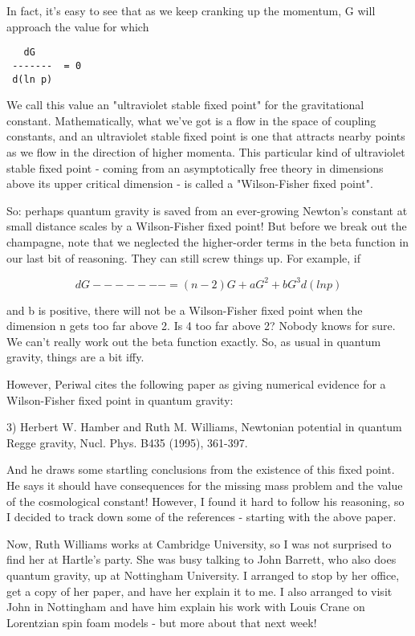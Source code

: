 In fact, it's easy to see that as we keep cranking up the momentum,
G will approach the value for which 

\begin{verbatim}
   dG 
 -------  = 0
 d(ln p)
\end{verbatim}
    
We call this value an "ultraviolet stable 
fixed point" for the gravitational
constant.  Mathematically, what we've got is a flow in the space 
of coupling constants, and an ultraviolet stable fixed point is one
that attracts nearby points as we flow in the direction of higher 
momenta.  This particular kind of ultraviolet stable fixed point - coming 
from an asymptotically free theory in dimensions above its upper 
critical dimension - is called a "Wilson-Fisher fixed point".  

So: perhaps quantum gravity is saved from an ever-growing Newton's
constant at small distance scales by a Wilson-Fisher fixed point!
But before we break out the champagne, note that we neglected the
higher-order terms in the beta function in our last bit of reasoning.
They can still screw things up.  For example, if

$$
   dG 
 -------  = (n - 2)G + aG^{2} + bG^{3} 
 d(ln p)
$$
    
and b is positive, there will not be a Wilson-Fisher fixed point
when the dimension n gets too far above 2.  Is 4 too far above 2?
Nobody knows for sure.  We can't really work out the beta function
exactly.  So, as usual in quantum gravity, things are a bit iffy.

However, Periwal cites the following paper as giving numerical
evidence for a Wilson-Fisher fixed point in quantum gravity:

3) Herbert W. Hamber and Ruth M. Williams, Newtonian potential in 
quantum Regge gravity, Nucl. Phys. B435 (1995), 361-397.  

And he draws some startling conclusions from the existence of
this fixed point.  He says it should have consequences for the
missing mass problem and the value of the cosmological constant!
However, I found it hard to follow his reasoning, so I decided
to track down some of the references - starting with the above
paper.  

Now, Ruth Williams works at Cambridge University, so I was not
surprised to find her at Hartle's party.  She was busy talking
to John Barrett, who also does quantum gravity, up at Nottingham
University.  I arranged to stop by her office, get a copy of her 
paper, and have her explain it to me.  I also arranged to visit
John in Nottingham and have him explain his work with Louis Crane 
on Lorentzian spin foam models - but more about that next week!

